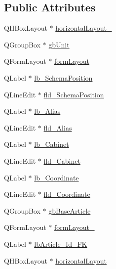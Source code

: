 \subsection*{Public Attributes}
\begin{DoxyCompactItemize}
\item 
Q\-H\-Box\-Layout $\ast$ \hyperlink{class_ui__mdt_cl_unit_editor_a275b094c8e46dc0317b9c98e5a8d8477}{horizontal\-Layout\-\_}
\item 
Q\-Group\-Box $\ast$ \hyperlink{class_ui__mdt_cl_unit_editor_a70bdfeaf51297b4d0325dd021591351d}{gb\-Unit}
\item 
Q\-Form\-Layout $\ast$ \hyperlink{class_ui__mdt_cl_unit_editor_ad0de42e75d2bbf613529a199419ec82b}{form\-Layout}
\item 
Q\-Label $\ast$ \hyperlink{class_ui__mdt_cl_unit_editor_acb999cbdc305fc0781a8eb2d9568e2db}{lb\-\_\-\-Schema\-Position}
\item 
Q\-Line\-Edit $\ast$ \hyperlink{class_ui__mdt_cl_unit_editor_aba5b4004525ad552669be5682ad5b932}{fld\-\_\-\-Schema\-Position}
\item 
Q\-Label $\ast$ \hyperlink{class_ui__mdt_cl_unit_editor_a1288c359f8ba4d0f09cf7686260feda7}{lb\-\_\-\-Alias}
\item 
Q\-Line\-Edit $\ast$ \hyperlink{class_ui__mdt_cl_unit_editor_a1cc230a41daf066bb90d542c4618b8e5}{fld\-\_\-\-Alias}
\item 
Q\-Label $\ast$ \hyperlink{class_ui__mdt_cl_unit_editor_a2a0a6f77f6300153283dca24177c0f02}{lb\-\_\-\-Cabinet}
\item 
Q\-Line\-Edit $\ast$ \hyperlink{class_ui__mdt_cl_unit_editor_a3f3a78ce3859fd6ab6bc260b5d8b6219}{fld\-\_\-\-Cabinet}
\item 
Q\-Label $\ast$ \hyperlink{class_ui__mdt_cl_unit_editor_acd3da5c66f1506ed88b2ea3e36deac66}{lb\-\_\-\-Coordinate}
\item 
Q\-Line\-Edit $\ast$ \hyperlink{class_ui__mdt_cl_unit_editor_a685554ff5b320147f4103c6b45226c12}{fld\-\_\-\-Coordinate}
\item 
Q\-Group\-Box $\ast$ \hyperlink{class_ui__mdt_cl_unit_editor_a0f161cab92cc14b342d66f7b7a80baa9}{gb\-Base\-Article}
\item 
Q\-Form\-Layout $\ast$ \hyperlink{class_ui__mdt_cl_unit_editor_a74239d65bfa0a348343c25a5cbef2025}{form\-Layout\-\_}
\item 
Q\-Label $\ast$ \hyperlink{class_ui__mdt_cl_unit_editor_abe071a9759646c58a0946d2a405ef979}{lb\-Article\-\_\-\-Id\-\_\-\-F\-K}
\item 
Q\-H\-Box\-Layout $\ast$ \hyperlink{class_ui__mdt_cl_unit_editor_ac8cb353d4ac12b2d4827822aabd2bbdc}{horizontal\-Layout}

\end{DoxyCompactItemize}
